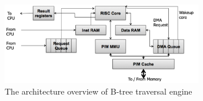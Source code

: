 \begin{figure}[t]
  \centering
  \includegraphics[height=1.4in]{figures/btree_engine.pdf}
  \caption{The architecture overview of B-tree traversal engine}
  \label{fig:btree_engine}
\end{figure}
